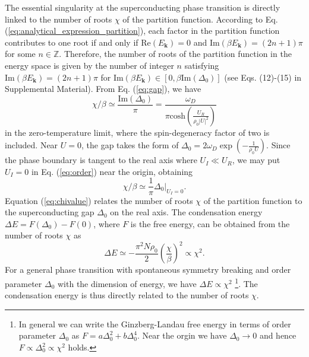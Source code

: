 \documentclass[aps,prl,twocolumn,superscriptaddress]{revtex4-1}
\begin{document}
The essential singularity at the superconducting phase transition is directly linked to the number of roots $\chi$ of the partition function. According to Eq. (\ref{eq:analytical_expression_partition}), each factor in the partition function contributes to one root if and only if $\mathrm{Re}(E_{\bm{k}})=0$ and $\mathrm{Im}(\beta E_{\bm{k}})=(2n+1)\pi$ for some $n\in\mathbb{Z}$. Therefore, the number of roots of the partition function in the energy space is given by the number of integer $n$ satisfying $\mathrm{Im}(\beta E_{\bm{k}})=(2n+1)\pi$ for $ \mathrm{Im}(\beta E_{\bm{k}})\in [0, \beta \text{Im}(\Delta_0)]$ (see Eqs. (12)-(15) in Supplemental Material). From Eq. (\ref{eq:gap}), we have
\begin{equation}
\chi/\beta\simeq\frac{\text{Im}(\Delta_0)}{\pi}=\frac{\omega_{D}}{\pi\text{cosh}(\frac{U_{R}}{\rho_{0}|U|^{2}})}\label{eq:order}
\end{equation}
in the zero-temperature limit, where the spin-degeneracy factor of two is included. %
Near $U=0$, the gap takes the form of $\Delta_0=2\omega_{D}\exp(-\frac{1}{\rho_{0}U})$.
Since the phase boundary is tangent to the real axis where $U_{I}\ll U_{R}$,
we may put $U_{I}=0$ in Eq. (\ref{eq:order}) near the origin, obtaining%
\begin{equation}
\chi/\beta\simeq\frac{1}{\pi}\Delta_0|_{U_I=0}.\label{eq:chivalue}
\end{equation}
Equation (\ref{eq:chivalue}) relates the number of roots $\chi$ of
the partition function %
to the superconducting gap $\Delta_0$ on the real axis. The %
condensation energy $\Delta E=F(\Delta_0)-F(0)$\cite{Coleman:2015vz}, %
where $F$ is the free energy, can be obtained from the number of roots $\chi$ %
as \cite{SupplementaryMaterial}
\begin{equation}
	\Delta E\simeq-\frac{\pi^2N\rho_0}{2}\left(\frac{\chi}{\beta}\right)^2\propto\chi^2.
\end{equation}
For a general phase transition with spontaneous symmetry breaking and order parameter $\Delta_0$ with the dimension of energy, we have $\Delta E\propto\chi^2$ \footnote{In general we can write the Ginzberg-Landau free energy in terms of order parameter $\Delta_0$ as $F=a\Delta_0^2+b\Delta_0^4$. Near the orgin we have $\Delta_0\to0$ and hence $F\propto\Delta_0^2\propto\chi^2$ holds.}. The condensation energy is thus directly related to the number of roots $\chi$. 
\end{document}
